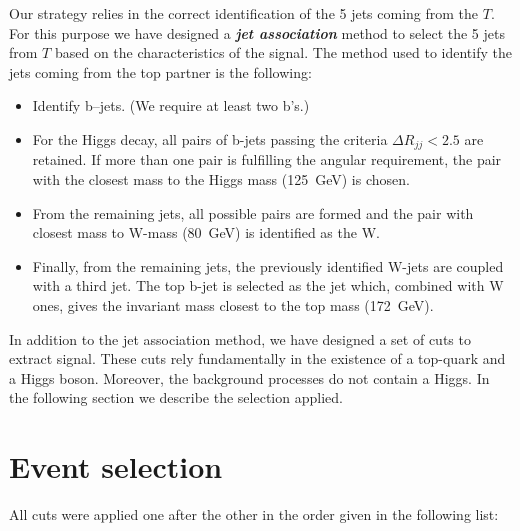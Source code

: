 Our strategy relies in the correct identification of the 5 jets coming from the $T$. For this purpose we have designed a \textbf{\textit{jet association}} method to select the 5 jets from $T$ based on the characteristics of the signal. The method used to identify the jets coming from the top partner is the following:
\begin{itemize}
\item Identify b--jets. (We require at least two b's.)
\item For the Higgs decay, all pairs of b-jets passing the criteria $\Delta R_{jj} <2.5$ are retained. If more than one pair is fulfilling the angular requirement, the pair with the closest mass to the Higgs mass (125~GeV) is chosen.
\item From the remaining jets, all possible pairs are formed and the pair with closest mass to W-mass (80~GeV) is identified as the W.
\item Finally, from the remaining jets, the previously identified W-jets are coupled with a third jet. The top b-jet is selected as the jet which, combined with W ones, gives the invariant mass closest to the top mass (172~GeV).
\end{itemize}

In addition to the jet association method, we have designed a set of cuts to extract signal. These cuts rely fundamentally in the existence of a top-quark and a Higgs boson. Moreover, the background processes do not contain a Higgs. In the following section we describe the selection applied.

\section{Event selection}
\label{sec:Psel}

All cuts were applied one after the other in the order given in the following list:

